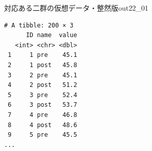 \begin{Rscreen}{対応ある二群の仮想データ・整然版}{out22_01}
	\begin{verbatim}
# A tibble: 200 × 3
      ID name  value
   <int> <chr> <dbl>
 1     1 pre    45.1
 2     1 post   45.8
 3     2 pre    45.1
 4     2 post   51.2
 5     3 pre    52.4
 6     3 post   53.7
 7     4 pre    46.8
 8     4 post   48.6
 9     5 pre    45.5
...

\end{verbatim}
\end{Rscreen}
